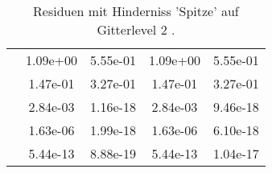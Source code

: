 \begin{table}
\begin{tabular}{c|cc|cc|}
\multicolumn{1}{|c|}{} & \multicolumn{1}{|c|}{  1.09e+00} & \multicolumn{1}{|c|}{  5.55e-01} & \multicolumn{1}{|c|}{  1.09e+00} & \multicolumn{1}{|c|}{  5.55e-01} \\ 
\multicolumn{1}{|c|}{} & \multicolumn{1}{|c|}{  1.47e-01} & \multicolumn{1}{|c|}{  3.27e-01} & \multicolumn{1}{|c|}{  1.47e-01} & \multicolumn{1}{|c|}{  3.27e-01} \\ 
\multicolumn{1}{|c|}{} & \multicolumn{1}{|c|}{  2.84e-03} & \multicolumn{1}{|c|}{  1.16e-18} & \multicolumn{1}{|c|}{  2.84e-03} & \multicolumn{1}{|c|}{  9.46e-18} \\ 
\multicolumn{1}{|c|}{} & \multicolumn{1}{|c|}{  1.63e-06} & \multicolumn{1}{|c|}{  1.99e-18} & \multicolumn{1}{|c|}{  1.63e-06} & \multicolumn{1}{|c|}{  6.10e-18} \\ 
\multicolumn{1}{|c|}{} & \multicolumn{1}{|c|}{  5.44e-13} & \multicolumn{1}{|c|}{  8.88e-19} & \multicolumn{1}{|c|}{  5.44e-13} & \multicolumn{1}{|c|}{  1.04e-17} \\ 
\hline 
\end{tabular}\caption{Residuen mit Hinderniss 'Spitze' auf Gitterlevel 2 .}\label{tab:Residuum_Spitze_level2}
\end{table} 
